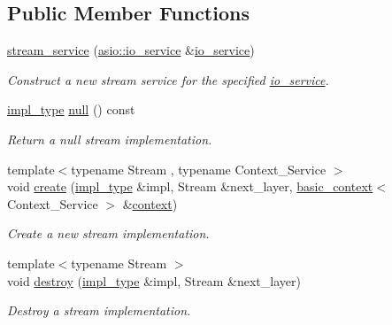 \subsection*{Public Member Functions}
\begin{DoxyCompactItemize}
\item 
\hyperlink{classasio_1_1ssl_1_1old_1_1stream__service_af4919a7e4b50145358658549958cc122}{stream\+\_\+service} (\hyperlink{classasio_1_1io__service}{asio\+::io\+\_\+service} \&\hyperlink{classasio_1_1io__service}{io\+\_\+service})
\begin{DoxyCompactList}\small\item\em Construct a new stream service for the specified \hyperlink{classasio_1_1io__service}{io\+\_\+service}. \end{DoxyCompactList}\item 
\hyperlink{classasio_1_1ssl_1_1old_1_1stream__service_a7e2131ccd16fbc04d0f86c61288e4175}{impl\+\_\+type} \hyperlink{classasio_1_1ssl_1_1old_1_1stream__service_af28fc99c480c7d3f964bf0adfcdd647d}{null} () const 
\begin{DoxyCompactList}\small\item\em Return a null stream implementation. \end{DoxyCompactList}\item 
{\footnotesize template$<$typename Stream , typename Context\+\_\+\+Service $>$ }\\void \hyperlink{classasio_1_1ssl_1_1old_1_1stream__service_a255aeb049ca1c806f35daaaa0172e388}{create} (\hyperlink{classasio_1_1ssl_1_1old_1_1stream__service_a7e2131ccd16fbc04d0f86c61288e4175}{impl\+\_\+type} \&impl, Stream \&next\+\_\+layer, \hyperlink{classasio_1_1ssl_1_1old_1_1basic__context}{basic\+\_\+context}$<$ Context\+\_\+\+Service $>$ \&\hyperlink{classasio_1_1ssl_1_1context}{context})
\begin{DoxyCompactList}\small\item\em Create a new stream implementation. \end{DoxyCompactList}\item 
{\footnotesize template$<$typename Stream $>$ }\\void \hyperlink{classasio_1_1ssl_1_1old_1_1stream__service_a3dd2c7ff1e62ac7a3705d3003cccb9ed}{destroy} (\hyperlink{classasio_1_1ssl_1_1old_1_1stream__service_a7e2131ccd16fbc04d0f86c61288e4175}{impl\+\_\+type} \&impl, Stream \&next\+\_\+layer)
\begin{DoxyCompactList}\small\item\em Destroy a stream implementation. \end{DoxyCompactList}\item 

\end{DoxyCompactItemize}
